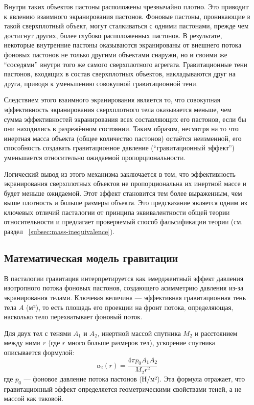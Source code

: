 \documentclass[pdflatex,sn-mathphys-num,referee]{sn-jnl}
\begin{document}
Внутри таких объектов пастоны расположены чрезвычайно плотно. Это приводит к явлению взаимного экранирования пастонов. Фоновые пастоны, проникающие в такой сверхплотный объект, могут сталкиваться с одними пастонами, прежде чем достигнут других, более глубоко расположенных пастонов. В результате, некоторые внутренние пастоны оказываются экранированы от внешнего потока фоновых пастонов не только другими объектами снаружи, но и своими же ``соседями'' внутри того же самого сверхплотного агрегата. Гравитационные тени пастонов, входящих в состав сверхплотных объектов, накладываются друг на друга, приводя к уменьшению совокупной гравитационной тени.

Следствием этого взаимного экранирования является то, что совокупная эффективность экранирования сверхплотного тела оказывается меньше, чем сумма эффективностей экранирования всех составляющих его пастонов, если бы они находились в разрежённом состоянии. Таким образом, несмотря на то что инертная масса объекта (общее количество пастонов) остаётся неизменной, его способность создавать гравитационное давление (``гравитационный эффект'') уменьшается относительно ожидаемой пропорциональности.

Логический вывод из этого механизма заключается в том, что эффективность экранирования сверхплотных объектов не пропорциональна их инертной массе и будет меньше ожидаемой. Этот эффект становится тем более выраженным, чем выше плотность и больше размеры объекта. Это предсказание является одним из ключевых отличий пасталогии от принципа эквивалентности общей теории относительности и предлагает проверяемый способ фальсификации теории (см. раздел ~\ref{subsec:mass-inequivalence}).

\subsection{Математическая модель гравитации}\label{subsec:gravity-model}

В пасталогии гравитация интерпретируется как эмерджентный эффект давления изотропного потока фоновых пастонов, создающего асимметрию давления из-за экранирования телами. Ключевая величина --- эффективная гравитационная тень тела \( A \) (м²), то есть площадь его проекции на фронт потока, определяющая, насколько тело перехватывает фоновый поток.

Для двух тел с тенями \( A_1 \) и \( A_2 \), инертной массой спутника \( M_2 \) и расстоянием между ними \( r \) (где \( r \) много больше размеров тел), ускорение спутника описывается формулой:
\[
a_2(r) = \frac{4\pi p_0 A_1 A_2}{M_2 r^2}
\]
где \( p_0 \) --- фоновое давление потока пастонов (Н/м²). Эта формула отражает, что гравитационный эффект определяется геометрическими свойствами теней, а не массой как таковой.
\end{document}
